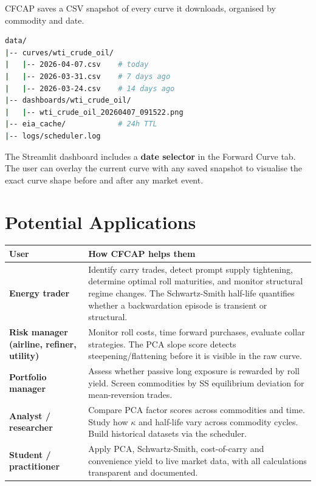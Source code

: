 \documentclass[11pt,a4paper]{article}
\begin{document}
CFCAP saves a CSV snapshot of every curve it downloads, organised by commodity and date.

\begin{lstlisting}[language=bash]
data/
|-- curves/wti_crude_oil/
|   |-- 2026-04-07.csv    # today
|   |-- 2026-03-31.csv    # 7 days ago
|   |-- 2026-03-24.csv    # 14 days ago
|-- dashboards/wti_crude_oil/
|   |-- wti_crude_oil_20260407_091522.png
|-- eia_cache/            # 24h TTL
|-- logs/scheduler.log
\end{lstlisting}

The Streamlit dashboard includes a \textbf{date selector} in the Forward Curve tab. 
The user can overlay the current curve with any saved snapshot to visualise the exact curve shape before and after any market event.

\section{Potential Applications}

\begin{center}
\begin{tabularx}{\textwidth}{>{\bfseries}l X}
\toprule
User & How CFCAP helps them \\
\midrule
Energy trader
  & Identify carry trades, detect prompt supply tightening, determine optimal roll maturities, and monitor structural regime changes. The Schwartz-Smith half-life quantifies whether a backwardation episode is transient or structural. \\
Risk manager (airline, refiner, utility)
  & Monitor roll costs, time forward purchases, evaluate collar strategies. The PCA slope score detects steepening/flattening before it is visible in the raw curve. \\
Portfolio manager
  & Assess whether passive long exposure is rewarded by roll yield. Screen commodities by SS equilibrium deviation for mean-reversion trades. \\
Analyst / researcher
  & Compare PCA factor scores across commodities and time. Study how $\kappa$ and half-life vary across commodity cycles. Build historical datasets via the scheduler. \\
Student / practitioner
  & Apply PCA, Schwartz-Smith, cost-of-carry and convenience yield to live market data, with all calculations transparent and documented. \\
\bottomrule
\end{tabularx}
\end{center}
\end{document}
